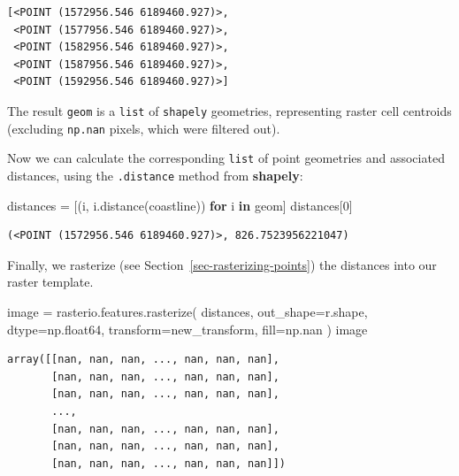 \documentclass[
  letterpaper,
]{krantz}
\newenvironment{Shaded}{\begin{snugshade}}{\end{snugshade}}
\newcommand{\ControlFlowTok}[1]{\textcolor[rgb]{0.00,0.23,0.31}{\textbf{#1}}}
\newcommand{\DecValTok}[1]{\textcolor[rgb]{0.68,0.00,0.00}{#1}}
\newcommand{\KeywordTok}[1]{\textcolor[rgb]{0.00,0.23,0.31}{\textbf{#1}}}
\newcommand{\NormalTok}[1]{\textcolor[rgb]{0.00,0.23,0.31}{#1}}
\newcommand{\OperatorTok}[1]{\textcolor[rgb]{0.37,0.37,0.37}{#1}}
\begin{document}
\begin{verbatim}
[<POINT (1572956.546 6189460.927)>,
 <POINT (1577956.546 6189460.927)>,
 <POINT (1582956.546 6189460.927)>,
 <POINT (1587956.546 6189460.927)>,
 <POINT (1592956.546 6189460.927)>]
\end{verbatim}

The result \texttt{geom} is a \texttt{list} of \texttt{shapely}
geometries, representing raster cell centroids (excluding
\texttt{np.nan} pixels, which were filtered out).

Now we can calculate the corresponding \texttt{list} of point geometries
and associated distances, using the \texttt{.distance} method from
\textbf{shapely}:

\begin{Shaded}
\begin{Highlighting}[]
\NormalTok{distances }\OperatorTok{=}\NormalTok{ [(i, i.distance(coastline)) }\ControlFlowTok{for}\NormalTok{ i }\KeywordTok{in}\NormalTok{ geom]}
\NormalTok{distances[}\DecValTok{0}\NormalTok{]}
\end{Highlighting}
\end{Shaded}

\begin{verbatim}
(<POINT (1572956.546 6189460.927)>, 826.7523956221047)
\end{verbatim}

Finally, we rasterize (see Section~\ref{sec-rasterizing-points}) the
distances into our raster template.

\begin{Shaded}
\begin{Highlighting}[]
\NormalTok{image }\OperatorTok{=}\NormalTok{ rasterio.features.rasterize(}
\NormalTok{    distances,}
\NormalTok{    out\_shape}\OperatorTok{=}\NormalTok{r.shape,}
\NormalTok{    dtype}\OperatorTok{=}\NormalTok{np.float64,}
\NormalTok{    transform}\OperatorTok{=}\NormalTok{new\_transform,}
\NormalTok{    fill}\OperatorTok{=}\NormalTok{np.nan}
\NormalTok{)}
\NormalTok{image}
\end{Highlighting}
\end{Shaded}

\begin{verbatim}
array([[nan, nan, nan, ..., nan, nan, nan],
       [nan, nan, nan, ..., nan, nan, nan],
       [nan, nan, nan, ..., nan, nan, nan],
       ...,
       [nan, nan, nan, ..., nan, nan, nan],
       [nan, nan, nan, ..., nan, nan, nan],
       [nan, nan, nan, ..., nan, nan, nan]])
\end{verbatim}
\end{document}
